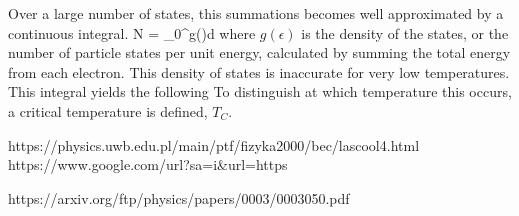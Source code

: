 Over a large number of states, this summations becomes well approximated by a continuous integral.
\beq
N = \int_0^{\infty}{g(\epsilon)}d\epsilon
\eeq
where $g(\epsilon)$ is the density of the states, or the number of particle states per unit energy, calculated by summing the total energy from each electron. This density of states is inaccurate for very low temperatures. 
This integral yields the following
To distinguish at which temperature this occurs, a critical temperature is defined, $T_C$. 

https://physics.uwb.edu.pl/main/ptf/fizyka2000/bec/lascool4.html
https://www.google.com/url?sa=i&url=https%

https://arxiv.org/ftp/physics/papers/0003/0003050.pdf